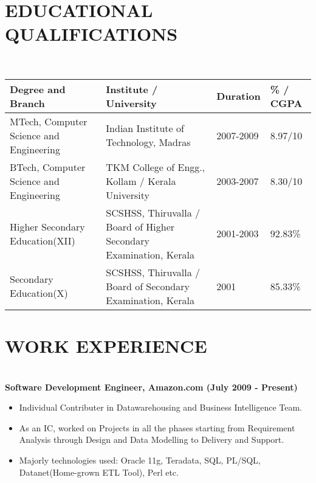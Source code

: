 \documentclass{res}
\begin{document}
 


\address{\textbf{Email:} vijayalekshmikesavan@gmail.com}
\address{\textbf{Mobile:} +919492529285}
                                  
\begin{resume}

\section{EDUCATIONAL QUALIFICATIONS}				
\textbf{\\}
\begin{tabular}{| p{4.7cm}|p{5.5cm}|p{1.6cm}|p{1.7cm}|}
\hline \textbf{Degree and Branch} & \textbf{Institute / University} & \textbf{Duration} & \textbf{\% / CGPA} \\ 
\hline MTech, Computer Science and  Engineering & Indian Institute of Technology, Madras & 2007-2009 & 8.97/10 \\ 
\hline BTech, Computer Science and  Engineering & TKM College of Engg., Kollam / Kerala University & 2003-2007 & 8.30/10 \\ 
\hline Higher Secondary Education(XII) & SCSHSS, Thiruvalla / Board of Higher Secondary Examination, Kerala & 2001-2003 & 92.83\% \\ 
\hline Secondary Education(X) & SCSHSS, Thiruvalla / Board of Secondary Examination, Kerala & 2001 & 85.33\% \\ 
\hline 
\end{tabular} 

\section{WORK EXPERIENCE}

\textbf{\\Software Development Engineer, Amazon.com (July 2009 - Present)}

\begin{itemize}

\item Individual Contributer in Datawarehousing and Business Intelligence Team. 
\item As an IC, worked on Projects in all the phases starting from Requirement Analysis through Design and Data Modelling to Delivery and Support.
\item Majorly technologies used: Oracle 11g, Teradata, SQL, PL/SQL, Datanet(Home-grown ETL Tool), Perl etc. 
\end {itemize}  


\end{resume}
\end{document}
